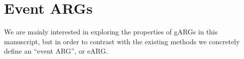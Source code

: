 \documentclass{article}
\begin{document}

\section*{Event ARGs}\label{eARG}
We are mainly interested in exploring the properties of gARGs in
this manuscript, but in order to contrast with the existing
methods we concretely define an ``event ARG'', or eARG.
\end{document}
